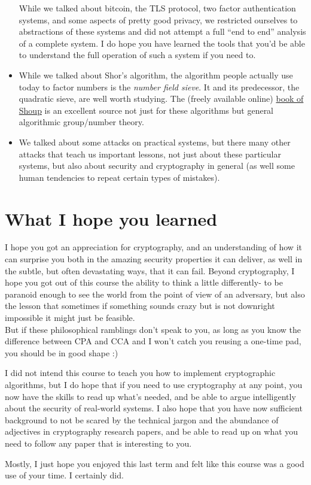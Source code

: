 \begin{itemize}
  While we talked about bitcoin, the TLS protocol, two factor
  authentication systems, and some aspects of pretty good privacy, we
  restricted ourselves to abstractions of these systems and did not
  attempt a full ``end to end'' analysis of a complete system. I do hope
  you have learned the tools that you'd be able to understand the full
  operation of such a system if you need to.
\item
  While we talked about Shor's algorithm, the algorithm people actually
  use today to factor numbers is the \emph{number field sieve}. It and
  its predecessor, the quadratic sieve, are well worth studying. The
  (freely available online) \href{http://www.shoup.net/ntb/}{book of
  Shoup} is an excellent source not just for these algorithms but
  general algorithmic group/number theory.
\item
  We talked about some attacks on practical systems, but there many
  other attacks that teach us important lessons, not just about these
  particular systems, but also about security and cryptography in
  general (as well some human tendencies to repeat certain types of
  mistakes).
\end{itemize}

\section{What I hope you learned}\label{26-What-I-hope-you-learne}

I hope you got an appreciation for cryptography, and an understanding of
how it can surprise you both in the amazing security properties it can
deliver, as well in the subtle, but often devastating ways, that it can
fail. Beyond cryptography, I hope you got out of this course the ability
to think a little differently- to be paranoid enough to see the world
from the point of view of an adversary, but also the lesson that
sometimes if something sounds crazy but is not downright impossible it
might just be feasible.\\
But if these philosophical ramblings don't speak to you, as long as you
know the difference between CPA and CCA and I won't catch you reusing a
one-time pad, you should be in good shape :)

I did not intend this course to teach you how to implement cryptographic
algorithms, but I do hope that if you need to use cryptography at any
point, you now have the skills to read up what's needed, and be able to
argue intelligently about the security of real-world systems. I also
hope that you have now sufficient background to not be scared by the
technical jargon and the abundance of adjectives in cryptography
research papers, and be able to read up on what you need to follow any
paper that is interesting to you.

Mostly, I just hope you enjoyed this last term and felt like this course
was a good use of your time. I certainly did.
